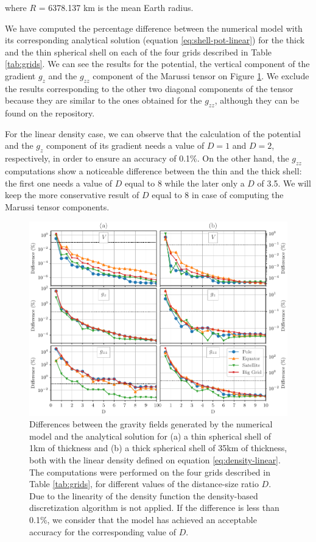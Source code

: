 \documentclass[extra]{gji}
\begin{document}
\noindent where $R$ = 6378.137 km is the mean Earth radius.

We have computed the percentage difference between the numerical model 
with its corresponding analytical solution (equation 
\ref{eq:shell-pot-linear}) for the thick and the thin spherical shell 
on each of the four grids described in Table \ref{tab:grids}.
We can see the results for the potential, the vertical component of the 
gradient $g_z$ and the $g_{zz}$ component of the Marussi tensor on 
Figure \ref{fig:D-linear}.
We exclude the results corresponding to the other two diagonal 
components of the tensor because they are similar to the ones obtained 
for the $g_{zz}$, although they can be found on the repository. 

For the linear density case, we can observe that the calculation of the 
potential and the $g_z$ component of its gradient needs a value of 
$D=1$ and $D=2$, respectively, in order to ensure an accuracy of 0.1\%.
On the other hand, the $g_{zz}$ computations show a noticeable 
difference between the thin and the thick shell: the first one needs a 
value of $D$ equal to 8 while the later only a $D$ of 3.5.
We will keep the more conservative result of $D$ equal to 8 in case of 
computing the Marussi tensor components.

\begin{figure}
\centering
\includegraphics[width=0.9\linewidth]{figures/linear-D.pdf}
\caption{
    Differences between the gravity fields generated by the numerical 
    model and the analytical solution for (a) a thin spherical shell of 
    1km of thickness and (b) a thick spherical shell of 35km of thickness,
    both with the linear density defined on equation 
    \ref{eq:density-linear}.
    The computations were performed on the four grids described in 
    Table \ref{tab:grids}, for different values of the distance-size 
    ratio $D$.
    Due to the linearity of the density function the density-based 
    discretization algorithm is not applied.
    If the difference is less than 0.1\%, we consider that the model 
    has achieved an acceptable accuracy for the corresponding value of 
    $D$.
    }
\label{fig:D-linear}
\end{figure}
\end{document}
